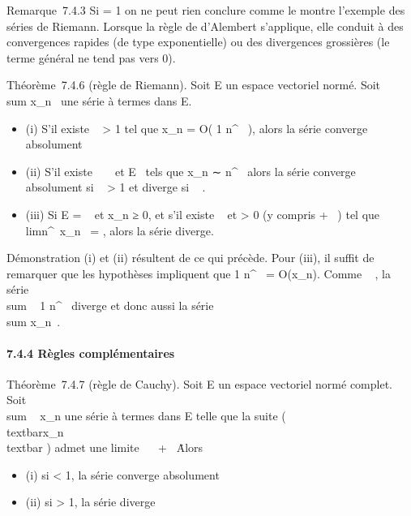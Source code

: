 \documentclass[]{article}
\begin{document}
Remarque~7.4.3 Si \ell = 1 on ne peut rien conclure comme le montre
l'exemple des séries de Riemann. Lorsque la règle de d'Alembert
s'applique, elle conduit à des convergences rapides (de type
exponentielle) ou des divergences grossières (le terme général ne tend
pas vers 0).

Théorème~7.4.6 (règle de Riemann). Soit E un espace vectoriel normé.
Soit \\sum  x\_n~
une série à termes dans E.

\begin{itemize}
\itemsep1pt\parskip0pt
\item
  (i) S'il existe \alpha~ \textgreater{} 1 tel que x\_n = O( 1
  \over n^\alpha~ ), alors la série converge
  absolument
\item
  (ii) S'il existe \alpha~ \in {}~ et \ell \in E \diagdown\0\
  tels que x\_n ∼ \ell \over n^\alpha~
  alors la série converge absolument si \alpha~ \textgreater{} 1 et diverge si
  \alpha~ \leq 1.
\item
  (iii) Si E = ~ et x\_n ≥ 0, et s'il existe \alpha~  et \ell
  \textgreater{} 0 (y compris + \infty~) tel que
  limn^\alpha~x\_n~ = \ell, alors la
  série diverge.
\end{itemize}

Démonstration (i) et (ii) résultent de ce qui précède. Pour (iii), il
suffit de remarquer que les hypothèses impliquent que  1
\over n^\alpha~ = O(x\_n). Comme \alpha~ , la
série \\sum ~  1
\over n^\alpha~ diverge et donc aussi la série
\\sum  x\_n~.

\paragraph{7.4.4 Règles complémentaires}

Théorème~7.4.7 (règle de Cauchy). Soit E un espace vectoriel normé
complet. Soit \\sum ~
x\_n une série à termes dans E telle que la suite
\left
(\rootn\of\\textbar{}x\_n\\textbar{}\right
) admet une limite \ell \in {}~ \cup\ + \infty~\.
Alors

\begin{itemize}
\itemsep1pt\parskip0pt
\item
  (i) si \ell \textless{} 1, la série converge absolument
\item
  (ii) si \ell \textgreater{} 1, la série diverge
\end{itemize}
\end{document}
